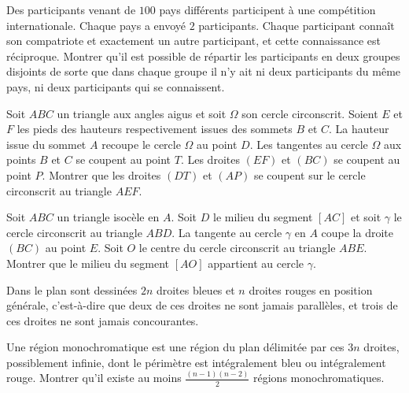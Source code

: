 

\begin{exo}
Des participants venant de $100$ pays différents participent à une compétition internationale. Chaque pays a envoyé $2$ participants. Chaque participant connaît son compatriote et exactement un autre participant, et cette connaissance est réciproque. Montrer qu'il est possible de répartir les participants en deux groupes disjoints de sorte que dans chaque groupe il n'y ait ni deux participants du même pays, ni deux participants qui se connaissent.
\end{exo}


\begin{exo}
Soit $ABC$ un triangle aux angles aigus et soit $\Omega$ son cercle circonscrit. Soient $E$ et $F$ les pieds des hauteurs respectivement issues des sommets $B$ et $C$. La hauteur issue du sommet $A$ recoupe le cercle $\Omega$ au point $D$. Les tangentes au cercle $\Omega$ aux points $B$ et $C$ se coupent au point $T$. Les droites $(EF)$ et $(BC)$ se coupent au point $P$. Montrer que les droites $(DT)$ et $(AP)$ se coupent sur le cercle circonscrit au triangle $AEF$.  
\end{exo}


\begin{exo}
Soit $ABC$ un triangle isocèle en $A$. Soit $D$ le milieu du segment $[AC]$ et soit $\gamma$ le cercle circonscrit au triangle $ABD$. La tangente au cercle $\gamma$ en $A$ coupe la droite $(BC)$ au point $E$. Soit $O$ le centre du cercle circonscrit au triangle $ABE$. Montrer que le milieu du segment $[AO]$ appartient au cercle $\gamma$. 
\end{exo}


\begin{exo}
Dans le plan sont dessinées $2n$ droites bleues et $n$ droites rouges en position générale, c'est-à-dire que deux de ces droites ne sont jamais parallèles, et trois de ces droites ne sont jamais concourantes.

Une région monochromatique est une région du plan délimitée par ces $3n$ droites, possiblement infinie, dont le périmètre est intégralement bleu ou intégralement rouge. Montrer qu'il existe au moins $\frac{(n-1)(n-2)}{2}$ régions monochromatiques.
\end{exo}




